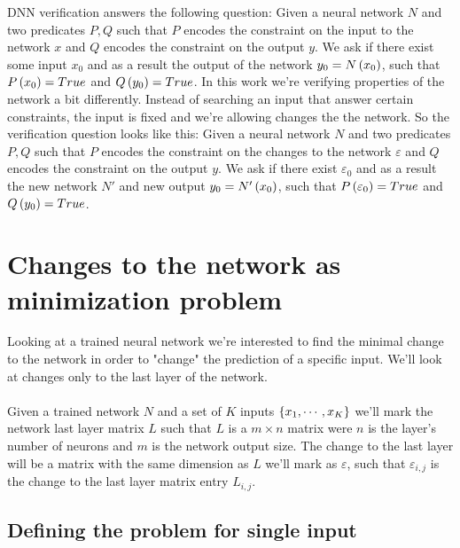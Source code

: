 \documentclass[a4paper]{easychair}
\begin{document}
DNN verification answers the following question: Given a neural network $N$ and two predicates $P,Q$ such that $P$ encodes the constraint on the input to the network $x$ and $Q$ encodes the constraint on the output $y$. We ask if there exist some input $x_0$ and as a result the output of the network $y_0=N\left(x_0\right)$, such that $P\left(x_0\right)=True$ and $Q\left(y_0\right)=True$.
In this work we're verifying properties of the network a bit differently. Instead of searching an input that answer certain constraints, the input is fixed and we're allowing changes the the network. So the verification question looks like this: Given a neural network $N$ and two predicates $P,Q$ such that $P$ encodes the constraint on the changes to the network $\varepsilon$ and $Q$ encodes the constraint on the output $y$. We ask if there exist $\varepsilon_0$ and as a result the new network $N'$ and new output $y_0=N'\left(x_0\right)$, such that $P\left(\varepsilon_0\right)=True$ and $Q\left(y_0\right)=True$.  
\cite{KaBaDiJuKo17Reluplex,KaHuIbJuLaLiShThWuZeDiKoBa19Marabou}

\section{Changes to the network as minimization problem}
\label{sec:minimizationProblem}

Looking at a trained neural network we're interested to find the minimal change to the network in order to "change" the prediction of a specific input. We'll look at changes only to the last layer of the network.
\\\\
Given a trained network $N$ and a set of $K$ inputs $\left\lbrace x_1,\cdots,x_K\right\rbrace$ we'll mark the network last layer matrix $L$ such that $L$ is a $m\times n$ matrix were $n$ is the layer's number of neurons and $m$ is the network output size. The change to the last layer will be a matrix with the same dimension as $L$ we'll mark as $\varepsilon$, such that $\varepsilon_{i,j}$ is the change to the last layer matrix entry $L_{i,j}$. 

\subsection{Defining the problem for single input}
\label{sec:defineProblem1}
\end{document}
